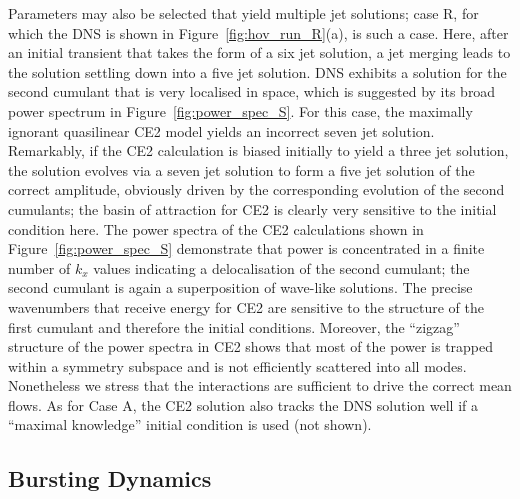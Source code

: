 \documentclass{jfm}
\begin{document}
Parameters may also be selected that yield multiple jet solutions; case R, for which the DNS is shown in Figure~\ref{fig:hov_run_R}(a), is such a case. Here, after an initial transient that takes the form of a six jet solution, a jet merging leads to the solution settling down into a five jet solution. DNS exhibits a solution for the second cumulant that is very localised in space, which is suggested by its broad power spectrum in Figure~\ref{fig:power_spec_S}. For this case, the maximally ignorant quasilinear CE2 model yields an incorrect seven jet solution. Remarkably, if the CE2 calculation is biased  initially to yield a three jet solution, the solution evolves via a seven jet solution to form a five jet solution of the correct amplitude, obviously driven by the corresponding evolution of the second cumulants; the basin of attraction for CE2 is clearly very sensitive to the initial condition here. The power spectra of the CE2 calculations shown in Figure~\ref{fig:power_spec_S} demonstrate that power is concentrated in a finite number of $k_x$ values indicating a delocalisation of the second cumulant; the second cumulant is again a superposition of wave-like solutions. The precise wavenumbers that receive energy for CE2 are sensitive to the structure of the first cumulant and therefore the initial conditions. Moreover, the  ``zigzag'' structure of the power spectra in CE2 shows that most of the power is trapped within a symmetry subspace and is not efficiently scattered into all modes. Nonetheless we stress that the interactions are sufficient to drive the correct mean flows.  As for Case A, the CE2 solution also tracks the DNS solution well if a ``maximal knowledge'' initial condition is used (not shown).



\subsection{Bursting Dynamics}
\end{document}
